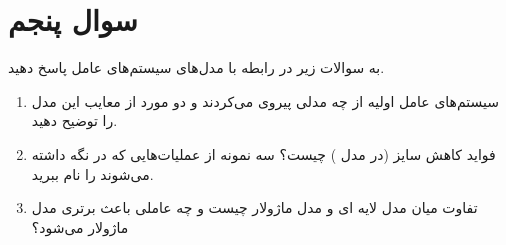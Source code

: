 \section{سوال پنجم}

به سوالات زیر در رابطه با مدل‌های سیستم‌های عامل پاسخ دهید.

\begin{enumerate}
	\item 
	سیستم‌های عامل اولیه از چه مدلی پیروی می‌کردند و دو مورد از معایب این مدل را توضیح دهید.
	\begin{qsolve}
		
	\end{qsolve}
	
	
	\item 
	فواید کاهش سایز  (در مدل ) چیست؟ سه نمونه از عملیات‌هایی که در  نگه داشته می‌شوند را نام ببرید.
	
	\begin{qsolve}
		
	\end{qsolve}
	
	
	\item 
	تفاوت میان مدل لایه ای و مدل ماژولار چیست و چه عاملی باعث برتری مدل ماژولار می‌شود؟
	\begin{qsolve}
		
	\end{qsolve}
	
\end{enumerate}